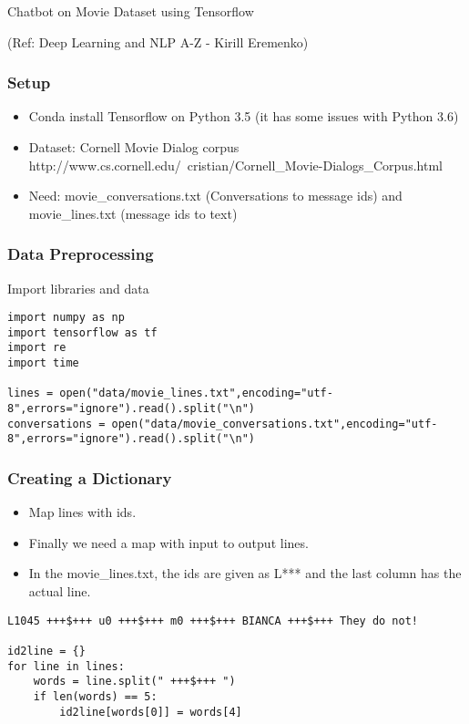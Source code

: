 \begin{frame}[fragile]\frametitle{}
\begin{center}
{\Large Chatbot on Movie Dataset using Tensorflow}

\tiny{(Ref: Deep Learning and NLP A-Z - Kirill Eremenko)}
\end{center}
\end{frame}

\begin{frame}[fragile]\frametitle{Setup}

\begin{itemize}
\item Conda install Tensorflow on Python 3.5 (it has some issues with Python 3.6)
\item Dataset: Cornell Movie Dialog corpus http://www.cs.cornell.edu/~cristian/Cornell\_Movie-Dialogs\_Corpus.html
\item Need: movie\_conversations.txt (Conversations to message ids) and movie\_lines.txt (message ids to text)
\end{itemize}
\end{frame}

\begin{frame}[fragile]\frametitle{Data Preprocessing}
Import libraries and data
\begin{lstlisting}
import numpy as np
import tensorflow as tf
import re
import time

lines = open("data/movie_lines.txt",encoding="utf-8",errors="ignore").read().split("\n")
conversations = open("data/movie_conversations.txt",encoding="utf-8",errors="ignore").read().split("\n")
\end{lstlisting}
\end{frame}

\begin{frame}[fragile]\frametitle{Creating a Dictionary}
\begin{itemize}
\item Map lines with ids.
\item Finally we need a map with input to output lines. 
\item In the movie\_lines.txt, the ids are given as L*** and the last column has the actual line.
\end{itemize}


\begin{lstlisting}
L1045 +++$+++ u0 +++$+++ m0 +++$+++ BIANCA +++$+++ They do not!

id2line = {}
for line in lines:
    words = line.split(" +++$+++ ")
    if len(words) == 5:
        id2line[words[0]] = words[4]
        
\end{lstlisting}
\end{frame}

